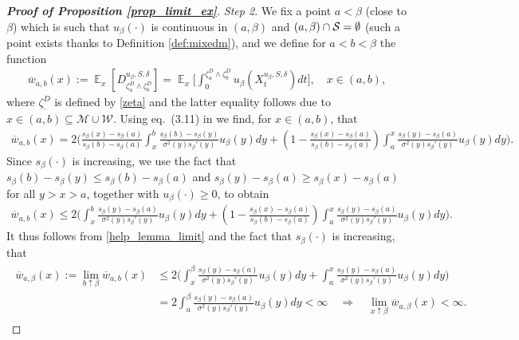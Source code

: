 \documentclass[11pt]{article} %
\DeclareMathOperator{\E}{\mathbb E}
\numberwithin{komcounter}{section}
\newcommand{\ol}{\overline}
\begin{document}
\begin{proof}[\bf Proof of Proposition \ref{prop_limit_ex}]
\vspace{1mm}
{\it Step 2}. 
We fix a point $a<\beta$ (close to $\beta$) which is such that $u_\beta(\cdot)$ is continuous in $(a,\beta)$ and $(a,\beta) \cap \cal S=\emptyset$ (such a point exists thanks to Definition \ref{def:mixedm}), and we define for $a<b<\beta$ the function
\begin{align} \label{wab}
\ol{w}_{a,b}(x) 
:= \E_x \left[ D^{u_\beta,S,\delta}_{\zeta^D_a\wedge\zeta^D_b} \right] 
= \E_x \bigg[ \int_0^{\zeta^D_a\wedge\zeta^D_b} u_\beta(X_t^{u_\beta,S,\delta}) dt \bigg] , 
\quad x\in(a,b),
\end{align}
where $\zeta^D_{\cdot}$ is defined by \eqref{zeta} and the latter equality follows due to $x \in (a,b) \subseteq \mathcal{M} \cup \mathcal{W}$. 
Using eq.~(3.11) in \cite[Chapter~15.3]{karlin1981second}
we find, for $x\in (a,b)$, that 
\begin{align*}
\ol w_{a,b}(x)
= 2 \bigg(\frac{s_\beta(x)-s_\beta(a)}{s_\beta(b)-s_\beta(a)}\int_x^b\frac{s_\beta(b)-s_\beta(y)}{\sigma^2(y)s_\beta'(y)}u_\beta(y)dy+ \left(1-\frac{s_\beta(x)-s_\beta(a)}{s_\beta(b)-s_\beta(a)}\right)
\int_a^x\frac{s_\beta(y)-s_\beta(a)}{\sigma^2(y)s_\beta'(y)}u_\beta(y)dy\bigg).
\end{align*}
Since $s_\beta(\cdot)$ is increasing, we use the fact  that 
$s_\beta(b)-s_\beta(y) \leq s_\beta(b)-s_\beta(a)$  
and $s_\beta(y)-s_\beta(a) \geq s_\beta(x)-s_\beta(a)$ for all $y>x>a$, 
together with $u_\beta(\cdot) \geq 0$, to obtain 
\begin{align*}
\ol{w}_{a,b}(x) 
\leq 2 \bigg(\int_x^b \frac{s_\beta(y)-s_\beta(a)}{\sigma^2(y)s_\beta'(y)} u_\beta(y) dy 
+ \left(1-\frac{s_\beta(x)-s_\beta(a)}{s_\beta(b)-s_\beta(a)}\right) \int_a^x\frac{s_\beta(y)-s_\beta(a)}{\sigma^2(y)s_\beta'(y)} u_\beta(y) dy \bigg).
\end{align*}
It thus follows from \eqref{help_lemma_limit} and the fact that $s_\beta(\cdot)$ is increasing, that
\begin{align} \label{wabeta}
\begin{split}
\ol{w}_{a,\beta}(x) 
:= \lim_{b\uparrow\beta} \ol{w}_{a,b}(x) 
&\leq 2 \bigg(\int_x^\beta \frac{s_\beta(y)-s_\beta(a)}{\sigma^2(y)s_\beta'(y)} u_\beta(y) dy 
+ \int_a^x \frac{s_\beta(y)-s_\beta(a)}{\sigma^2(y)s_\beta'(y)} u_\beta(y) dy \bigg) \\
&= 2 \int_a^\beta \frac{s_\beta(y)-s_\beta(a)}{\sigma^2(y)s_\beta'(y)} u_\beta(y) dy < \infty 
\quad \Rightarrow \quad 
\lim_{x \uparrow \beta} \ol{w}_{a,\beta}(x) < \infty.
\end{split}
\end{align}



\end{proof}
\end{document}

